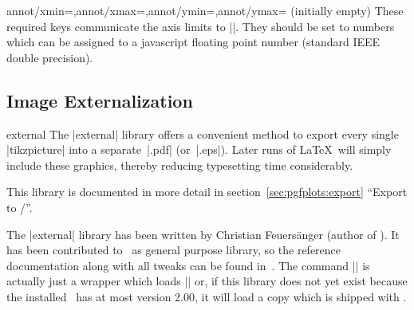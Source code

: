 \begin{pgfplotskeylist}{annot/xmin=,annot/xmax=,annot/ymin=,annot/ymax= (initially empty)}
	These required keys communicate the axis limits to |\pgfplotsclickablecreate|. They should be set to numbers which can be assigned to a javascript floating point number (standard IEEE double precision).
\end{pgfplotskeylist}




\subsection{Image Externalization}
\begin{pgfplotslibrary}{external}
	The |external| library offers a convenient method to export every single |tikzpicture| into a separate~|.pdf| (or~|.eps|). Later runs of \LaTeX\ will simply include these graphics, thereby reducing typesetting time considerably.
	
	This library is documented in more detail in section~\ref{sec:pgfplots:export} ``Export to {\pdf/\eps}''.


	The |external| library has been written by Christian Feuers\"anger (author of \PGFPlots). It has been contributed to \Tikz\ as general purpose library, so the reference documentation along with all tweaks can be found in~\cite[Section ``Externalization Library'']{tikz}. The command || is actually just a wrapper which loads |\usetikzlibrary{external}| or, if this library does not yet exist because the installed \pgfname\ has at most version $2.00$, it will load a copy which is shipped with \PGFPlots.
\end{pgfplotslibrary}
